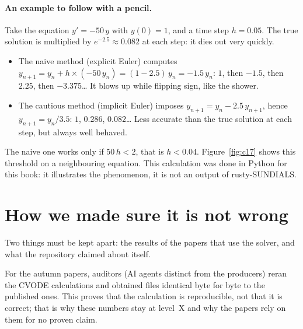 \paragraph{An example to follow with a pencil.} Take the equation $y'=-50\,y$ with $y(0)=1$, and a time step
$h=0.05$. The true solution is multiplied by $e^{-2.5}\approx0.082$ at each step: it dies out very quickly.
\begin{itemize}
\item The naive method (explicit Euler) computes $y_{n+1}=y_n+h\times(-50\,y_n)=(1-2.5)\,y_n=-1.5\,y_n$:
  $1$, then $-1.5$, then $2.25$, then $-3.375$\ldots{} It blows up while flipping sign, like the shower.
\item The cautious method (implicit Euler) imposes $y_{n+1}=y_n-2.5\,y_{n+1}$, hence $y_{n+1}=y_n/3.5$:
  $1$, $0.286$, $0.082$\ldots{} Less accurate than the true solution at each step, but always well behaved.
\end{itemize}
The naive one works only if $50\,h<2$, that is $h<0.04$. Figure~\ref{fig:c17} shows this threshold on a
neighbouring equation. This calculation was done in Python for this book: it illustrates the phenomenon, it is not
an output of rusty-SUNDIALS.

\section*{How we made sure it is not wrong}

Two things must be kept apart: the results of the papers that use the solver, and what the repository claimed about
itself.

For the autumn papers, auditors (AI agents distinct from the producers) reran the CVODE calculations and obtained
files identical byte for byte to the published ones. This proves that the calculation is reproducible, not that it
is correct; that is why these numbers stay at level~X and why the papers rely on them for no proven claim.

